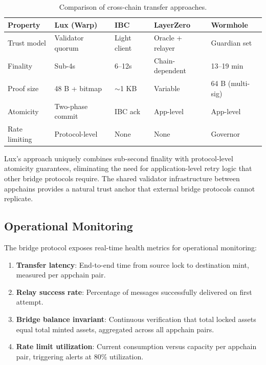 \documentclass[11pt,a4paper]{article}
\begin{document}
\begin{table}[H]
\centering
\caption{Comparison of cross-chain transfer approaches.}
\label{tab:bridgecompare}
\begin{tabular}{p{2.8cm}p{2cm}p{2cm}p{2cm}p{2.5cm}}
\toprule
\textbf{Property} & \textbf{Lux (Warp)} & \textbf{IBC} & \textbf{LayerZero} & \textbf{Wormhole} \\
\midrule
Trust model & Validator quorum & Light client & Oracle + relayer & Guardian set \\
Finality & Sub-4s & 6--12s & Chain-dependent & 13--19 min \\
Proof size & 48 B + bitmap & $\sim$1 KB & Variable & 64 B (multi-sig) \\
Atomicity & Two-phase commit & IBC ack & App-level & App-level \\
Rate limiting & Protocol-level & None & None & Governor \\
\bottomrule
\end{tabular}
\end{table}

Lux's approach uniquely combines sub-second finality with protocol-level atomicity guarantees, eliminating the need for application-level retry logic that other bridge protocols require. The shared validator infrastructure between appchains provides a natural trust anchor that external bridge protocols cannot replicate.

\subsection{Operational Monitoring}

The bridge protocol exposes real-time health metrics for operational monitoring:

\begin{enumerate}
    \item \textbf{Transfer latency}: End-to-end time from source lock to destination mint, measured per appchain pair.
    \item \textbf{Relay success rate}: Percentage of messages successfully delivered on first attempt.
    \item \textbf{Bridge balance invariant}: Continuous verification that total locked assets equal total minted assets, aggregated across all appchain pairs.
    \item \textbf{Rate limit utilization}: Current consumption versus capacity per appchain pair, triggering alerts at 80\% utilization.
\end{enumerate}
\end{document}
